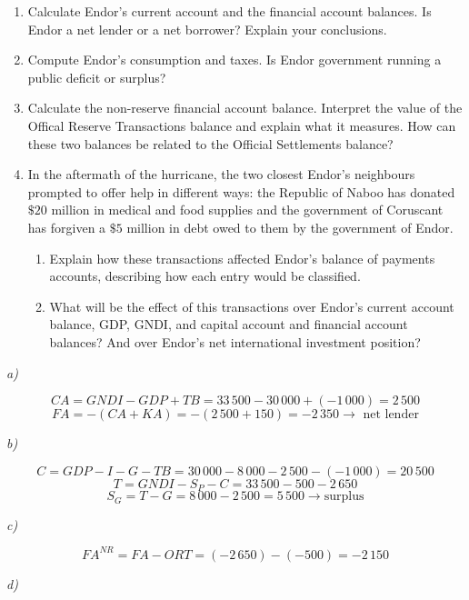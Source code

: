 \documentclass[11pt, a4paper]{article}
\begin{document}
\begin{enumerate}[label=\emph{\alph*}), topsep = \lineskip, itemsep = \lineskip, partopsep = \lineskip, parsep = \lineskip]
	\item  Calculate Endor’s current account and the financial account balances. Is Endor a net lender or a net borrower? Explain your conclusions.
	\item Compute Endor’s consumption and taxes. Is Endor government running a public
  deficit or surplus?
  \item Calculate the non-reserve financial account balance. Interpret the value of the Offical Reserve Transactions balance and explain what it measures. How can these two balances be related to the Official Settlements balance?
  \item In the aftermath of the hurricane, the two closest Endor’s neighbours prompted to offer help in different ways: the Republic of Naboo has donated $\$20$ million in medical and food supplies and the government of Coruscant has forgiven a $\$5$ million in debt owed to them by the government of Endor.
	\begin{enumerate}[label=\roman*., topsep = \lineskip, itemsep = \lineskip, partopsep = \lineskip, parsep = \lineskip]
		\item Explain how these transactions affected Endor’s balance of payments accounts, describing
    how each entry would be classified.
		\item What will be the effect of this transactions over Endor’s current account balance, GDP, GNDI, and capital account and financial account balances? And over Endor’s net international investment position?
	\end{enumerate}
\end{enumerate}

\dotfill

\textit{a)}


$$CA =  GNDI - GDP + TB = 33\,500  - 30\,000 + (-1\,000) = 2\,500$$
$$FA =  -(CA + KA) = -(2\,500+150) = -2\,350 \rightarrow \text{ net lender}$$


\textit{b)}

$$C =  GDP - I - G - TB = 30\,000 - 8\,000 - 2\,500 - (-1\,000) = 20\,500$$
$$T =  GNDI - S_P - C = 33\,500 - 500 - 2\,650$$
$$S_G = T - G = 8\,000-2\,500 = 5\,500 \rightarrow \text{surplus}$$

\newpage
\textit{c)}

$$ FA^{NR} = FA - ORT = (-2\,650) - (-500) = -2\,150 $$

\textit{d)}
\end{document}
